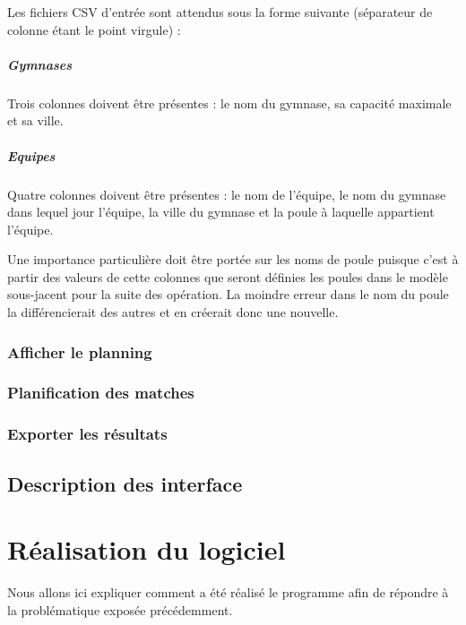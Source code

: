 \documentclass[final, noposter]{polytech/polytech}
\begin{document}
			Les fichiers CSV d'entrée sont attendus sous la forme suivante (séparateur de colonne étant le point virgule) :

			\paragraph{Gymnases}
				Trois colonnes doivent être présentes : le nom du gymnase, sa capacité maximale et sa ville.
				

			\paragraph{Equipes}
				Quatre colonnes doivent être présentes : le nom de l'équipe, le nom du gymnase dans lequel jour l'équipe, la ville du gymnase et la poule à laquelle appartient l'équipe.
				

				Une importance particulière doit être portée sur les noms de poule puisque c'est à partir des valeurs de cette colonnes que seront définies les poules dans le modèle sous-jacent pour la suite des opération. La moindre erreur dans le nom du poule la différencierait des autres et en créerait donc une nouvelle.

		\subsection{Afficher le planning}

		\subsection{Planification des matches}

		\subsection{Exporter les résultats}

	\section{Description des interface}
	
\chapter{Réalisation du logiciel}
	Nous allons ici expliquer comment a été réalisé le programme afin de répondre à la problématique exposée précédemment.
	
\end{document}
